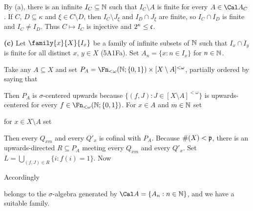 {

\noindent By (a), there is an infinite $I_C\subseteq\Bbb N$ such that
$I_C\setminus A$ is finite for every $A\in\Cal A_C$.   If
$C$, $D\subseteq\kappa$ and $\xi\in C\setminus D$, then
$I_C\setminus J_{\xi}$ and $I_D\cap J_{\xi}$ are
finite, so $I_C\cap I_D$ is finite and $I_C\ne I_D$.   Thus
$C\mapsto I_C$ is injective and $2^{\kappa}\le\frak c$.

\medskip

{\bf (c)} Let
$\family{x}{X}{I_x}$ be a family of infinite subsets of $\Bbb N$ such that
$I_x\cap I_y$ is finite for all distinct $x$, $y\in X$ (5A1Fa).   Set
$A_n=\{x:n\in I_x\}$ for $n\in\Bbb N$.

Take any $A\subseteq X$ and set
$P_A=\Fn_{<\omega}(\Bbb N;\{0,1\})\times[X\setminus A]^{<\omega}$,
partially ordered by saying that


\noindent Then $P_A$ is $\sigma$-centered upwards because
$\{(f,J):J\in[X\setminus A]^{<\omega}\}$ is upwards-centered for every
$f\in\Fn_{<\omega}(\Bbb N;\{0,1\})$.   For $x\in A$ and $m\in\Bbb N$ set


\noindent for $x\in X\setminus A$ set


\noindent Then every $Q_{xm}$ and every $Q'_x$ is cofinal with $P_A$.
Because $\#(X)<\frak p$, there is an upwards-directed $R\subseteq P_A$
meeting every $Q_{xm}$ and every $Q'_x$.   Set
$L=\bigcup_{(f,J)\in R}\{i:f(i)=1\}$.   Now


\noindent Accordingly


\noindent belongs to the $\sigma$-algebra generated by
$\Cal A=\{A_n:n\in\Bbb N\}$, and we have a suitable family.
}%

